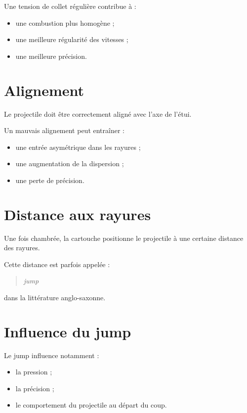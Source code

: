 Une tension de collet régulière contribue à :

\begin{itemize}
    \item une combustion plus homogène ;
    \item une meilleure régularité des vitesses ;
    \item une meilleure précision.
\end{itemize}

\section{Alignement}

Le projectile doit être correctement aligné avec l'axe de l'étui.

Un mauvais alignement peut entraîner :

\begin{itemize}
    \item une entrée asymétrique dans les rayures ;
    \item une augmentation de la dispersion ;
    \item une perte de précision.
\end{itemize}

\section{Distance aux rayures}

Une fois chambrée, la cartouche positionne le projectile à une certaine
distance des rayures.

Cette distance est parfois appelée :

\begin{quote}
\emph{jump}
\end{quote}

dans la littérature anglo-saxonne.

\section{Influence du jump}

Le jump influence notamment :

\begin{itemize}
    \item la pression ;
    \item la précision ;
    \item le comportement du projectile au départ du coup.
\end{itemize}

